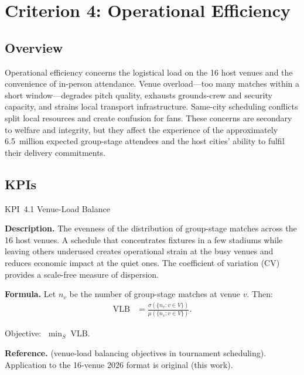 \documentclass[12pt, letterpaper]{article}
\newcommand{\kpilabel}[1]{\noindent\textbf{#1}\enspace}
\begin{document}
\section{Criterion 4: Operational Efficiency}

\subsection{Overview}

Operational efficiency concerns the logistical load on the 16 host
venues and the convenience of in-person attendance.  Venue
overload---too many matches within a short window---degrades pitch
quality, exhausts grounds-crew and security capacity, and strains local
transport infrastructure.  Same-city scheduling conflicts split local
resources and create confusion for fans.  These concerns are secondary
to welfare and integrity, but they affect the experience of the
approximately 6.5~million expected group-stage attendees and the host
cities' ability to fulfil their delivery commitments.

\subsection{KPIs}

\begin{kpibox}{KPI~4.1 \textendash{} Venue-Load Balance}

\kpilabel{Description.}
The evenness of the distribution of group-stage matches across the 16
host venues.  A schedule that concentrates fixtures in a few stadiums
while leaving others underused creates operational strain at the busy
venues and reduces economic impact at the quiet ones.  The coefficient
of variation (CV) provides a scale-free measure of dispersion.

\medskip
\kpilabel{Formula.}
Let $n_v$ be the number of group-stage matches at venue $v$.  Then:
\begin{align*}
  \mathrm{VLB} &= \frac{\sigma(\{n_v : v \in V\})}
                       {\mu(\{n_v : v \in V\})}.
\end{align*}
\vspace{-8pt}

\noindent
Objective: $\;\displaystyle\min_{S}\;\mathrm{VLB}$.

\medskip
\kpilabel{Reference.}
\citet{RibeiroUrrutia2007} (venue-load balancing objectives in
tournament scheduling).  Application to the 16-venue 2026 format is
original (this work).
\end{kpibox}
\end{document}
